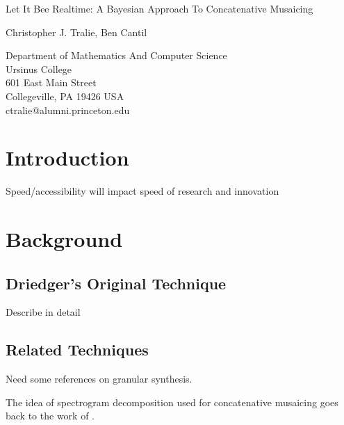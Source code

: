 \documentclass[letterpaper, 12pt]{article}
\begin{document}
{\cmjTitle Let It Bee Realtime: A Bayesian Approach To Concatenative Musaicing}
\vspace*{24pt}


{\cmjAuthor Christopher J. Tralie, Ben Cantil}	%
 
\begin{cmjAuthorAddress}
	Department of Mathematics And Computer Science\\
	Ursinus College\\
	601 East Main Street\\
	Collegeville, PA 19426 USA\\		%
	ctralie@alumni.princeton.edu
\end{cmjAuthorAddress}


\begin{abstract}

\end{abstract}

\section{Introduction}

Speed/accessibility will impact speed of research and innovation

\section{Background}


\subsection{Driedger's Original Technique}

Describe in detail

\subsection{Related Techniques}

Need some references on granular synthesis.

The idea of spectrogram decomposition used for concatenative musaicing goes back to the work of \cite{burred2013cross}.
\end{document}
